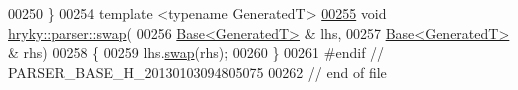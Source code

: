 \begin{DoxyCode}
00250 \}
00254 \textcolor{keyword}{template} <\textcolor{keyword}{typename} GeneratedT>
\hypertarget{parser__base_8h_source_l00255}{}\hyperlink{namespacehryky_1_1parser_acbeac181da6c2a9f92e921f9133cfa8f}{00255} \textcolor{keywordtype}{void} \hyperlink{namespacehryky_1_1parser_acbeac181da6c2a9f92e921f9133cfa8f}{hryky::parser::swap}(
00256     \hyperlink{classhryky_1_1parser_1_1_base}{Base<GeneratedT>} & lhs,
00257     \hyperlink{classhryky_1_1parser_1_1_base}{Base<GeneratedT>} & rhs)
00258 \{
00259     lhs.\hyperlink{classhryky_1_1parser_1_1_base_ab2b137d16fbe40d839ee136bd5304cab}{swap}(rhs);
00260 \}
00261 \textcolor{preprocessor}{#endif // PARSER\_BASE\_H\_20130103094805075}
00262 \textcolor{preprocessor}{}\textcolor{comment}{// end of file}
\end{DoxyCode}
